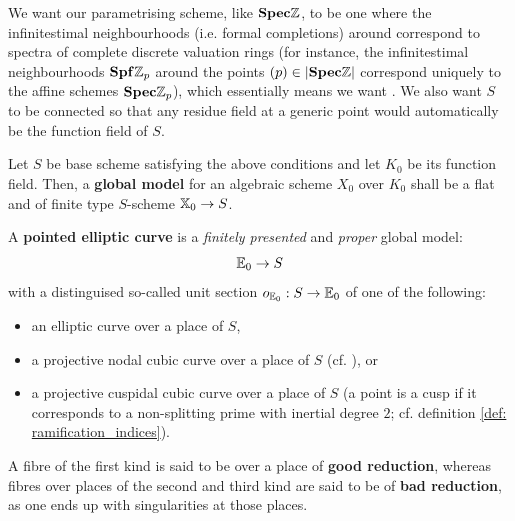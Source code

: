                    \begin{definition} \label{def: global_models}
                        We want our parametrising scheme, like $\mathbf{Spec} \mathbb{Z}$, to be one where the infinitestimal neighbourhoods (i.e. formal completions) around correspond to spectra of complete discrete valuation rings (for instance, the infinitestimal neighbourhoods $\mathbf{Spf} \mathbb{Z}_p$ around the points $(p) \in |\mathbf{Spec} \mathbb{Z}|$ correspond uniquely to the affine schemes $\mathbf{Spec} \mathbb{Z}_p$), which essentially means we want . We also want $S$ to be connected so that any residue field at a generic point would automatically be the function field of $S$.
                        
                        Let $S$ be base scheme satisfying the above conditions and let $K_0$ be its function field. Then, a \textbf{global model} for an algebraic scheme $X_0$ over $K_0$ shall be a flat and of finite type $S$-scheme $\mathbb{X}_0 \to S$. 
                    \end{definition}
                    \begin{remark} \label{remark: global_to_local_for_models}
                        
                    \end{remark}
                    
                    \begin{definition} \label{def: pointed_curves}
                        A \textbf{pointed elliptic curve} is a \textit{finitely presented} and \textit{proper} global model:
                            $$\mathbb{E}_0 \to S$$
                        with a distinguised so-called unit section $o_{\mathbb{E}_0}: S \to \mathbb{E}_0$ of one of the following:
                            \begin{itemize}
                                \item an elliptic curve over a place of $S$,
                                \item a projective nodal cubic curve over a place of $S$ (cf. \cite[\href{https://stacks.math.columbia.edu/tag/0C46}{Tag 0C46}]{stacks}), or
                                \item a projective cuspidal cubic curve over a place of $S$ (a point is a cusp if it corresponds to a non-splitting prime with inertial degree $2$; cf. definition \ref{def: ramification_indices}). 
                            \end{itemize}
                        A fibre of the first kind is said to be over a place of \textbf{good reduction}, whereas fibres over places of the second and third kind are said to be of \textbf{bad reduction}, as one ends up with singularities at those places.
                    \end{definition}
                    
